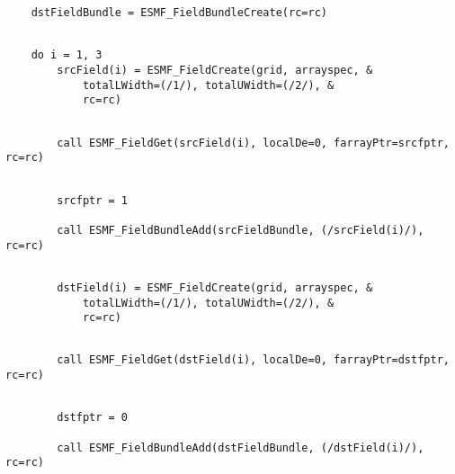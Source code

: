 
 \begin{verbatim}
    dstFieldBundle = ESMF_FieldBundleCreate(rc=rc)
 
\end{verbatim}
 

 \begin{verbatim}
    do i = 1, 3
        srcField(i) = ESMF_FieldCreate(grid, arrayspec, &
            totalLWidth=(/1/), totalUWidth=(/2/), &
            rc=rc)
 
\end{verbatim}
 

 \begin{verbatim}
        call ESMF_FieldGet(srcField(i), localDe=0, farrayPtr=srcfptr, rc=rc)
 
\end{verbatim}
 

 \begin{verbatim}
        srcfptr = 1

        call ESMF_FieldBundleAdd(srcFieldBundle, (/srcField(i)/), rc=rc)
 
\end{verbatim}
 

 \begin{verbatim}
        dstField(i) = ESMF_FieldCreate(grid, arrayspec, &
            totalLWidth=(/1/), totalUWidth=(/2/), &
            rc=rc)
 
\end{verbatim}
 

 \begin{verbatim}
        call ESMF_FieldGet(dstField(i), localDe=0, farrayPtr=dstfptr, rc=rc)
 
\end{verbatim}
 

 \begin{verbatim}
        dstfptr = 0

        call ESMF_FieldBundleAdd(dstFieldBundle, (/dstField(i)/), rc=rc)
 
\end{verbatim}
 
